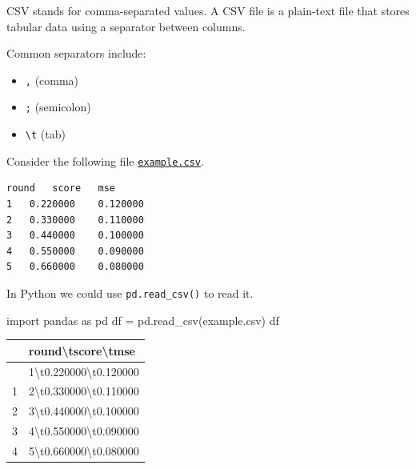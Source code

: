\documentclass[
  letterpaper,
  DIV=11,
  numbers=noendperiod]{scrreprt}
\newenvironment{Shaded}{\begin{snugshade}}{\end{snugshade}}
\newcommand{\ImportTok}[1]{\textcolor[rgb]{0.00,0.46,0.62}{#1}}
\newcommand{\NormalTok}[1]{\textcolor[rgb]{0.00,0.23,0.31}{#1}}
\newcommand{\OperatorTok}[1]{\textcolor[rgb]{0.37,0.37,0.37}{#1}}
\newcommand{\StringTok}[1]{\textcolor[rgb]{0.13,0.47,0.30}{#1}}
\newcounter{none} %
\providecommand{\tightlist}{%
  \setlength{\itemsep}{0pt}\setlength{\parskip}{0pt}}
\theoremstyle{definition}
\theoremstyle{definition}
\theoremstyle{plain}
\theoremstyle{plain}
\theoremstyle{remark}
\begin{document}
\begin{tcolorbox}[enhanced jigsaw, arc=.35mm, bottomrule=.15mm, bottomtitle=1mm, breakable, colback=white, colbacktitle=quarto-callout-note-color!10!white, colframe=quarto-callout-note-color-frame, coltitle=black, left=2mm, leftrule=.75mm, opacityback=0, opacitybacktitle=0.6, rightrule=.15mm, title=\textcolor{quarto-callout-note-color}{\faInfo}\hspace{0.5em}{CSV}, titlerule=0mm, toprule=.15mm, toptitle=1mm]

CSV stands for comma-separated values. A CSV file is a plain-text file
that stores tabular data using a separator between columns.

Common separators include:

\begin{itemize}
\tightlist
\item
  \texttt{,} (comma)
\item
  \texttt{;} (semicolon)
\item
  \texttt{\textbackslash{}t} (tab)
\end{itemize}

Consider the following file \href{example.csv}{\texttt{example.csv}}.

\begin{verbatim}
round   score   mse
1   0.220000    0.120000
2   0.330000    0.110000
3   0.440000    0.100000
4   0.550000    0.090000
5   0.660000    0.080000
\end{verbatim}

In Python we could use \texttt{pd.read\_csv()} to read it.

\begin{Shaded}
\begin{Highlighting}[]
\ImportTok{import}\NormalTok{ pandas }\ImportTok{as}\NormalTok{ pd}
\NormalTok{df }\OperatorTok{=}\NormalTok{ pd.read\_csv(}\StringTok{\textquotesingle{}example.csv\textquotesingle{}}\NormalTok{)}
\NormalTok{df}
\end{Highlighting}
\end{Shaded}

{\def\LTcaptype{none} %
\begin{longtable}[]{@{}ll@{}}
\toprule\noalign{}
& round\textbackslash tscore\textbackslash tmse \\
\midrule\noalign{}
\endhead
\bottomrule\noalign{}
\endlastfoot
0 & 1\textbackslash t0.220000\textbackslash t0.120000 \\
1 & 2\textbackslash t0.330000\textbackslash t0.110000 \\
2 & 3\textbackslash t0.440000\textbackslash t0.100000 \\
3 & 4\textbackslash t0.550000\textbackslash t0.090000 \\
4 & 5\textbackslash t0.660000\textbackslash t0.080000 \\
\end{longtable}
}


\end{tcolorbox}
\end{document}
